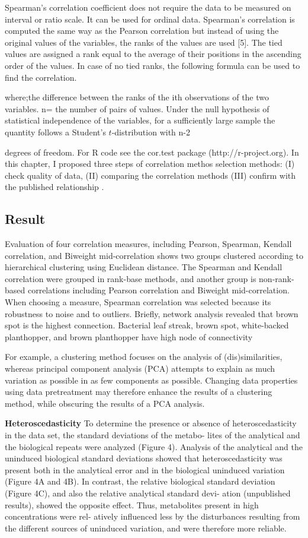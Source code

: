 {Spearman’s correlation coefficient does not require the data to be measured on interval or ratio scale. It can be used for ordinal data. Spearman’s correlation is computed the same way as the Pearson correlation but instead of using the original values of the variables, the ranks of the values are used [5]. The tied values are assigned a rank equal to the average of their positions in the ascending order of the values. In case of no tied ranks, the following formula can be used to find the correlation.

where;the difference between the ranks of the ith observations of the two variables. n= the number of pairs of values.
Under the null hypothesis of statistical independence of the variables, for a sufficiently large sample the quantity
follows a Student’s $t$-distribution with n-2

degrees of freedom. For R code see the cor.test package (http://r-project.org).
In this chapter, I proposed three steps of correlation methos selection methods: (I) check quality of data, (II) comparing  the correlation methods (III) confirm with the published relationship .


\subsection*{Result}
Evaluation of four correlation measures, including Pearson, Spearman, Kendall correlation, and Biweight mid-correlation shows two groups clustered according to hierarchical clustering using Euclidean distance. The Spearman and Kendall correlation were grouped in rank-base methods, and another group is non-rank-based correlations including Pearson correlation and Biweight mid-correlation. When choosing a measure, Spearman correlation was selected because its robustness to noise and to outliers.
Briefly, network analysis revealed that brown spot is the highest connection. Bacterial leaf streak, brown spot, white-backed planthopper, and brown planthopper have high node of connectivity

For example, a clustering method focuses on the analysis of (dis)similarities, whereas principal component analysis (PCA) attempts to explain as much variation as possible in as few components as possible. Changing data properties using data pretreatment may therefore enhance the results of a clustering method, while obscuring the results of a PCA analysis.

\textbf{Heteroscedasticity}
To determine the presence or absence of heteroscedasticity in the data set, the standard deviations of the metabo- lites of the analytical and the biological repeats were analyzed (Figure 4). Analysis of the analytical and the uninduced biological standard deviations showed that heteroscedasticity was present both in the analytical error and in the biological uninduced variation (Figure 4A and 4B). In contrast, the relative biological standard deviation (Figure 4C), and also the relative analytical standard devi- ation (unpublished results), showed the opposite effect. Thus, metabolites present in high concentrations were rel- atively influenced less by the disturbances resulting from the different sources of uninduced variation, and were therefore more reliable.

}
